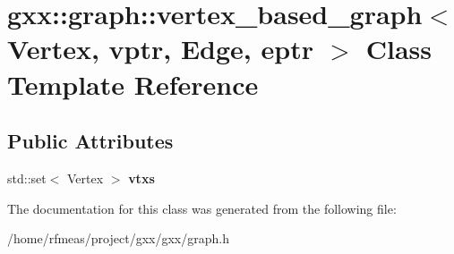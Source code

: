 \hypertarget{classgxx_1_1graph_1_1vertex__based__graph}{}\section{gxx\+:\+:graph\+:\+:vertex\+\_\+based\+\_\+graph$<$ Vertex, vptr, Edge, eptr $>$ Class Template Reference}
\label{classgxx_1_1graph_1_1vertex__based__graph}
\subsection*{Public Attributes}
\begin{DoxyCompactItemize}
\item 
std\+::set$<$ Vertex $>$ {\bfseries vtxs}\hypertarget{classgxx_1_1graph_1_1vertex__based__graph_aee2829b7dbb9cdabc30982c6f4aecc7d}{}\label{classgxx_1_1graph_1_1vertex__based__graph_aee2829b7dbb9cdabc30982c6f4aecc7d}

\end{DoxyCompactItemize}


The documentation for this class was generated from the following file\+:\begin{DoxyCompactItemize}
\item 
/home/rfmeas/project/gxx/gxx/graph.\+h\end{DoxyCompactItemize}
